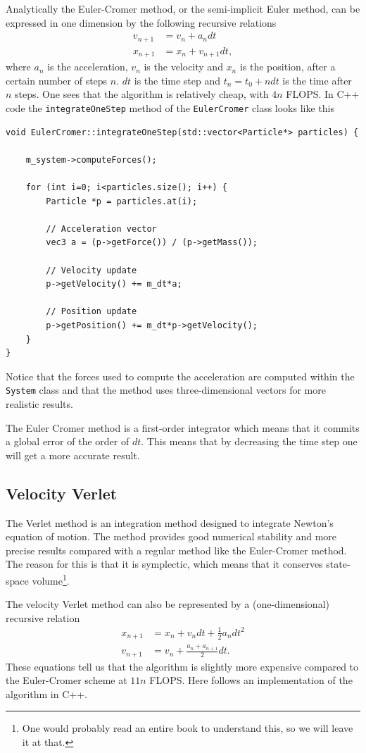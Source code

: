 \documentclass[10pt,a4paper]{amsart}
\begin{document}
Analytically the Euler-Cromer method, or the semi-implicit Euler method, can be expressed in one dimension by the following recursive relations
\begin{align}
v_{n+1} &= v_n + a_n dt \\
x_{n+1} &= x_n + v_{n+1} dt,
\end{align}
where $a_n$ is the acceleration, $v_n$ is the velocity and $x_n$ is the position, after a certain number of steps $n$. $dt$ is the time step and $t_n = t_0 + ndt$ is the time after $n$ steps. One sees that the algorithm is relatively cheap, with $4n$ FLOPS. In C++ code the \lstinline|integrateOneStep| method of the \lstinline|EulerCromer| class looks like this
\begin{lstlisting}
void EulerCromer::integrateOneStep(std::vector<Particle*> particles) {

	m_system->computeForces();
    
	for (int i=0; i<particles.size(); i++) {
		Particle *p = particles.at(i);

		// Acceleration vector
		vec3 a = (p->getForce()) / (p->getMass());
        
		// Velocity update
		p->getVelocity() += m_dt*a;

		// Position update
		p->getPosition() += m_dt*p->getVelocity();
	}
}
\end{lstlisting}
Notice that the forces used to compute the acceleration are computed within the \lstinline|System| class and that the method uses three-dimensional vectors for more realistic results.

The Euler Cromer method is a first-order integrator which means that it commits a global error of the order of $dt$. This means that by decreasing the time step one will get a more accurate result.

\subsection{Velocity Verlet}
The Verlet method is an integration method designed to integrate Newton's equation of motion. The method provides good numerical stability and more precise results compared with a regular method like the Euler-Cromer method. The reason for this is that it is symplectic, which means that it conserves state-space volume\footnote{One would probably read an entire book to understand this, so we will leave it at that.}.

The velocity Verlet method can also be represented by a (one-dimensional) recursive relation
\begin{align}
x_{n+1} &= x_n + v_ndt + \frac{1}{2}a_ndt^2 \\
v_{n+1} &= v_n + \frac{a_n + a_{n+1}}{2}dt.
\end{align}
These equations tell us that the algorithm is slightly more expensive compared to the Euler-Cromer scheme at $11n$ FLOPS. Here follows an implementation of the algorithm in C++.
\end{document}
